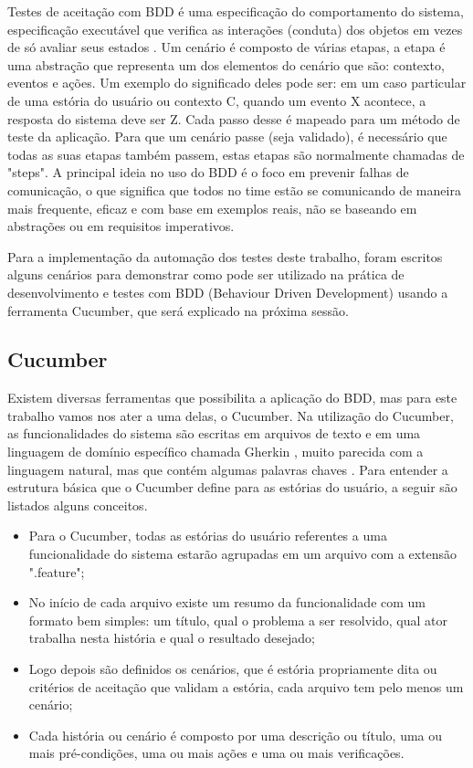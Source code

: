 \begin{itemize}
Testes de aceitação com BDD é uma especificação do comportamento do sistema, especificação executável que verifica as interações (conduta) dos objetos em vezes de só avaliar seus estados \cite{bddIntroducing}. Um cenário é composto de várias etapas, a etapa é uma abstração que representa um dos elementos do cenário que são: contexto, eventos e ações. Um exemplo do significado deles pode ser: em um caso particular de uma estória do usuário ou contexto C, quando um evento X acontece, a resposta do sistema deve ser Z. Cada passo desse é mapeado para um método de teste da aplicação. Para que um cenário passe (seja validado), é necessário que todas as suas etapas também passem, estas etapas são normalmente chamadas de "steps". A principal ideia no uso do BDD é o foco em prevenir falhas de comunicação, o que significa que todos no time estão se comunicando de maneira mais frequente, eficaz e com base em exemplos reais, não se baseando em abstrações ou em requisitos imperativos. 

Para a implementação da automação dos testes deste trabalho, foram escritos alguns cenários para demonstrar como pode ser utilizado na prática de desenvolvimento e testes com BDD (Behaviour Driven Development) usando a ferramenta Cucumber, que será explicado na próxima sessão.
\end{itemize}

\subsection{Cucumber}

Existem diversas ferramentas que possibilita a aplicação do BDD, mas para este trabalho vamos nos ater a uma delas, o Cucumber. Na utilização do Cucumber, as funcionalidades do sistema são escritas em arquivos de texto e em uma linguagem de domínio específico chamada Gherkin \cite{gherkin}, muito parecida com a linguagem natural, mas que contém algumas palavras chaves \cite{Cucumber}.  Para entender a estrutura básica que o Cucumber define para as estórias do usuário, a seguir são listados alguns conceitos.

\begin{itemize}

	\item Para o Cucumber, todas as  estórias do usuário referentes a uma funcionalidade do sistema estarão agrupadas em um arquivo com a extensão ".feature";
	\item No início de cada arquivo existe um resumo da funcionalidade com um formato bem simples: um título, qual o problema a ser resolvido, qual ator trabalha nesta história e qual o resultado desejado;
	\item Logo depois são definidos os cenários, que é estória propriamente dita ou critérios de aceitação que validam a estória, cada arquivo tem pelo menos um cenário;
	\item Cada história ou cenário é composto por uma descrição ou título, uma ou mais pré-condições, uma ou mais ações e uma ou mais verificações.
\end{itemize}

